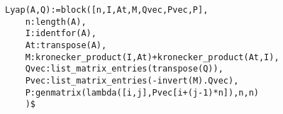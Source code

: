 \noindent
\begin{minipage}[t]{\textwidth}\color{blue}
\begin{verbatim}
Lyap(A,Q):=block([n,I,At,M,Qvec,Pvec,P],
    n:length(A),
    I:identfor(A),
    At:transpose(A),
    M:kronecker_product(I,At)+kronecker_product(At,I),
    Qvec:list_matrix_entries(transpose(Q)),
    Pvec:list_matrix_entries(-invert(M).Qvec),
    P:genmatrix(lambda([i,j],Pvec[i+(j-1)*n]),n,n)
    )$
\end{verbatim}
\end{minipage}
